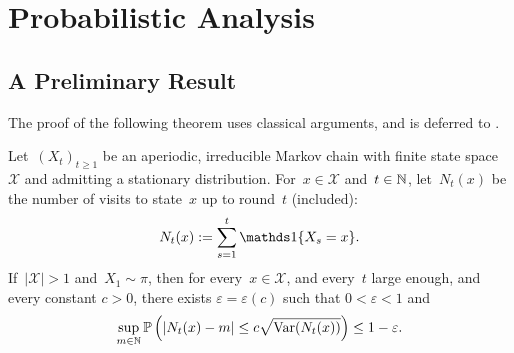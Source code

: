 \documentclass{article}
\newcommand{\rnote}[1]{{\color{myred} ({\bf Robin:} #1)}}
\newcommand{\inote}[1]{{\color{blue} ({\bf Isa:} #1)}}
\begin{document}
\section{Probabilistic Analysis} \label{sec:probabilistic_analysis}

\subsection{A Preliminary Result}

The proof of the following theorem uses classical arguments, and is deferred to .


\begin{theorem} \label{thm:visits_anti_concentration} Let~$(X_t)_{t \geq 1}$ be an aperiodic, irreducible Markov chain with finite state space~$\mathcal{X}$ and admitting a stationary distribution. For~$x \in \mathcal{X}$ and~$t \in \operatorname{\mathbb{N}}$, let~$N_t(x)$ be the number of visits to state~$x$ up to round~$t$ (included):
    \begin{equation*}
        N_t(x) := \sum_{s=1}^t \bbOne \{ X_s = x \}.
    \end{equation*}
    If~$|\mathcal{X}|>1$ and~$X_1 \sim \pi$, then for every~$x \in \mathcal{X}$, and every~$t$ large enough, and every constant $c>0$, there exists $\varepsilon = \varepsilon(c)$ such that $0<\varepsilon <1$ and
    \begin{equation*}
       \sup_{m \in \mathbb{N}} \operatorname{\mathbb{P}} \left( |N_t(x) - m| \leq c\sqrt{\mathrm{Var}(N_t(x))} \right)\leq 1-\varepsilon.
    \end{equation*}
\end{theorem}


%    
\end{document}
